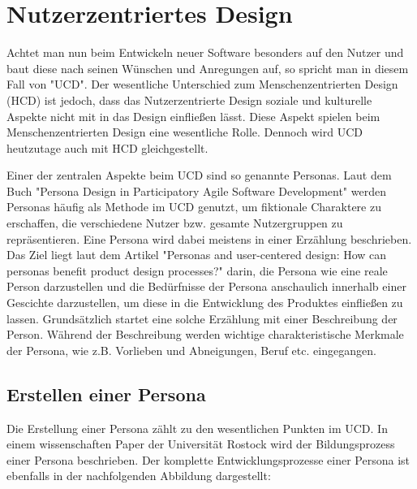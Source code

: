 \section{Nutzerzentriertes Design}

Achtet man nun beim Entwickeln neuer Software besonders auf den Nutzer und baut diese nach seinen Wünschen und Anregungen auf, so spricht man in diesem Fall von "\acf{UCD}". Der wesentliche Unterschied zum Menschenzentrierten Design (\acs{HCD}) ist jedoch, dass das Nutzerzentrierte Design soziale und kulturelle Aspekte nicht mit in das Design einfließen lässt.\cite{hcd2:2021} Diese Aspekt spielen beim Menschenzentrierten Design eine wesentliche Rolle. Dennoch wird \acs{UCD} heutzutage auch mit HCD gleichgestellt.\cite{ucd1:2011}

Einer der zentralen Aspekte beim \acs{UCD} sind so genannte Personas. Laut dem Buch "Persona Design in Participatory Agile Software Development" werden Personas häufig als Methode im \acs{UCD} genutzt, um fiktionale Charaktere zu erschaffen, die verschiedene Nutzer bzw. gesamte Nutzergruppen zu repräsentieren.\cite{personaDesign:2020} Eine Persona wird dabei meistens in einer Erzählung beschrieben.\cite{ucd1:2011} Das Ziel liegt laut dem Artikel "Personas and user-centered design: How can personas benefit product design processes?" darin, die Persona wie eine reale Person darzustellen und die Bedürfnisse der Persona anschaulich innerhalb einer Gescichte darzustellen, um diese in die Entwicklung des Produktes einfließen zu lassen.\cite{ucd1:2011}
Grundsätzlich startet eine solche Erzählung mit einer Beschreibung der Person.\cite{ucd1:2011} Während der Beschreibung werden wichtige charakteristische Merkmale der Persona, wie z.B. Vorlieben und Abneigungen, Beruf etc. eingegangen.\cite{ucd1:2011}

\subsection{Erstellen einer Persona}
Die Erstellung einer Persona zählt zu den wesentlichen Punkten im \acs{UCD}. In einem wissenschaften Paper der Universität Rostock wird der Bildungsprozess einer Persona beschrieben. Der komplette Entwicklungsprozesse einer Persona ist ebenfalls in der nachfolgenden Abbildung dargestellt:


